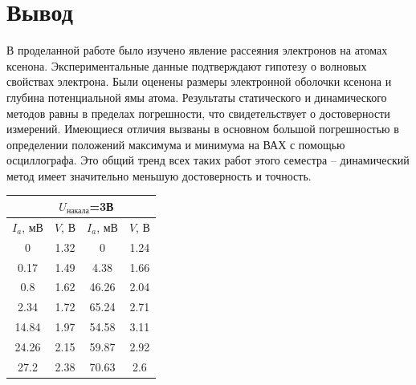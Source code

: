 \documentclass[a4paper, 12pt]{article}%
\begin{document}
	\section*{Вывод}
	В проделанной работе было изучено явление рассеяния электронов на атомах ксенона. Экспериментальные данные подтверждают гипотезу о волновых свойствах электрона. Были оценены размеры электронной оболочки ксенона и глубина потенциальной ямы атома. Результаты статического и динамического методов равны в пределах погрешности, что свидетельствует о достоверности измерений. Имеющиеся отличия вызваны в основном большой погрешностью в определении положений максимума и минимума на ВАХ с помощью осциллографа. Это общий тренд всех таких работ этого семестра -- динамический метод имеет значительно меньшую достоверность и точность.
	\begin{table}[]
	\begin{tabular}{|c|c|c|c|}
		\hline
		\rowcolor[HTML]{EFEFEF} 
		\multicolumn{2}{|c|}{\cellcolor[HTML]{EFEFEF}$U_{\text{накала}}$=2.7В} & \multicolumn{2}{c|}{\cellcolor[HTML]{EFEFEF}$U_{\text{накала}}$=3В} \\ \hline
		\rowcolor[HTML]{C0C0C0} 
		$I_a$, мВ                           & $V$, В                           & $I_a$, мВ                          & $V$, В                         \\ \hline
		0                                   & 1.32                             & 0                                  & 1.24                           \\ \hline
		0.17                                & 1.49                             & 4.38                               & 1.66                           \\ \hline
		0.8                                 & 1.62                             & 46.26                              & 2.04                           \\ \hline
		2.34                                & 1.72                             & 65.24                              & 2.71                           \\ \hline
		14.84                               & 1.97                             & 54.58                              & 3.11                           \\ \hline
		24.26                               & 2.15                             & 59.87                              & 2.92                           \\ \hline
		27.2                                & 2.38                             & 70.63                              & 2.6                            \\ \hline

\end{tabular}
\end{table}
\end{document}
